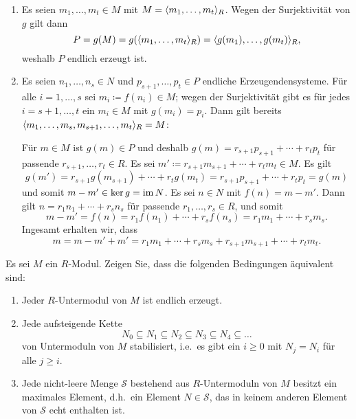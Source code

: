 \begin{solution}
  \begin{enumerate}
    \item
      Es seien $m_1, \dotsc, m_t \in M$ mit $M = \langle m_1, \dotsc, m_t\rangle_R$.
      Wegen der Surjektivität von $g$ gilt dann
      \[
          P
        = g(M)
        = g(\langle m_1, \dotsc, m_t\rangle_R)
        = \langle g(m_1), \dotsc, g(m_t)\rangle_R,
      \]
      weshalb $P$ endlich erzeugt ist.
    \item
      Es seien $n_1, \dotsc, n_s \in N$ und $p_{s+1}, \dotsc, p_t \in P$ endliche Erzeugendensysteme.
      Für alle $i = 1, \dotsc, s$ sei $m_i \coloneqq f(n_i) \in M$;
      wegen der Surjektivität gibt es für jedes $i = s+1, \dotsc, t$ ein $m_i \in M$ mit $g(m_i) = p_i$.
      Dann gilt bereits $\langle m_1, \dotsc, m_s, m_{s+1}, \dotsc, m_t\rangle_R = M$:
      
      Für $m \in M$ ist $g(m) \in P$ und deshalb $g(m) = r_{s+1} p_{s+1} + \dotsb + r_t p_t$ für passende $r_{s+1}, \dotsc, r_t \in R$.
      Es sei $m' \coloneqq r_{s+1} m_{s+1} + \dotsb + r_t m_t \in M$.
      Es gilt
      \[
          g(m')
        = r_{s+1} g(m_{s+1}) + \dotsb + r_t g(m_t)
        = r_{s+1} p_{s+1} + \dotsb + r_t p_t
        = g(m)
      \]
      und somit $m - m' \in \ker g = \operatorname{im} N$.
      Es sei $n \in N$ mit $f(n) = m - m'$.
      Dann gilt $n = r_1 n_1 + \dotsb + r_s n_s$ für passende $r_1, \dotsc, r_s \in R$, und somit
      \[
          m - m'
        = f(n)
        = r_1 f(n_1) + \dotsb + r_s f(n_s)
        = r_1 m_1 + \dotsb + r_s m_s.
      \]
      Ingesamt erhalten wir, dass
      \[
          m
        = m - m' + m'
        = r_1 m_1 + \dotsb + r_s m_s + r_{s+1} m_{s+1} + \dotsb + r_t m_t.
      \]
  \end{enumerate}
\end{solution}


\begin{question}[subtitle = Charakterisierungen noetherscher Moduln]
  \label{question: characterizations of noetherian modules}
  Es sei $M$ ein $R$-Modul.
  Zeigen Sie, dass die folgenden Bedingungen äquivalent sind:
  \begin{enumerate}
    \item
      \label{enum: every submodule is finitely generated}
      Jeder $R$-Untermodul von $M$ ist endlich erzeugt.
    \item
      \label{enum: every ascending chain of submodules stabilizes}
      Jede aufsteigende Kette
      \[
        N_0 \subseteq N_1 \subseteq N_2 \subseteq N_3 \subseteq N_4 \subseteq \dotso
      \]
      von Untermoduln von $M$ stabilisiert, i.e.\ es gibt ein $i \geq 0$ mit $N_j = N_i$ für alle $j \geq i$.
    \item
      \label{enum: every non empty collection of submodules has a maximal element}
      Jede nicht-leere Menge $\mathcal{S}$ bestehend aus $R$-Untermoduln von $M$ besitzt ein maximales Element, d.h.\ ein Element $N \in \mathcal{S}$, das in keinem anderen Element von $\mathcal{S}$ echt enthalten ist.
  \end{enumerate}
\end{question}


